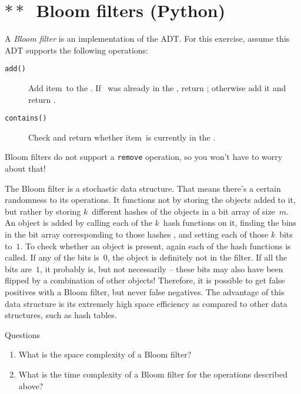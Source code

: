 \section{$\ast\ast$~Bloom filters (Python)}

A \emph{Bloom filter} is an implementation of the \Set ADT. For this exercise, assume this ADT supports the following operations:
%
\begin{description}
    \item[\texttt{add(\x)}] Add item~\x to the \Set. If \x~was already in the \Set, return \false; otherwise add it and return \true.
    \item[\texttt{contains(\x)}] Check and return whether item~\x is currently in the \Set.
\end{description}
%
Bloom filters do not support a \texttt{remove} operation, so you won't have to worry about that!

The Bloom filter is a stochastic data structure. That means there's a certain randomness to its operations. It functions not by storing the objects added to it, but rather by storing $k$~different hashes of the objects in a bit array of size~$m$. An object is added by calling each of the $k$~hash functions on it, finding the bins in the bit array corresponding to those hashes , and setting each of those $k$~bits to~$1$. To check whether an object is present, again each of the hash functions is called. If any of the bits is~$0$, the object is definitely not in the filter. If all the bits are~$1$, it probably is, but not necessarily -- these bits may also have been flipped by a combination of other objects! Therefore, it is possible to get false positives with a Bloom filter, but never false negatives. The advantage of this data structure is its extremely high space efficiency as compared to other data structures, such as hash tables.
%
\begin{mybox}{Questions}
    \begin{enumerate}
        \item What is the space complexity of a Bloom filter?
        \item What is the time complexity of a Bloom filter for the operations described above?
    \end{enumerate}
\end{mybox}

